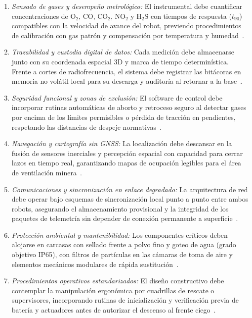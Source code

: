 \begin{enumerate}
    \item \textit{Sensado de gases y desempeño metrológico:} El instrumental debe cuantificar concentraciones de $\text{O}_2$, $\text{CO}$, $\text{CO}_2$, $\text{NO}_2$ y $\text{H}_2\text{S}$ con tiempos de respuesta ($t_{90}$) compatibles con la velocidad de avance del robot, previendo procedimientos de calibración con gas patrón y compensación por temperatura y humedad~\cite{OSINERGMIN_BoletinGSM_Ventilacion_2020, MINEM_DS024_2016}.
    
    \item \textit{Trazabilidad y custodia digital de datos:} Cada medición debe almacenarse junto con su coordenada espacial 3D y marca de tiempo determinística. Frente a cortes de radiofrecuencia, el sistema debe registrar las bitácoras en memoria no volátil local para su descarga y auditoría al retornar a la base~\cite{MINEM_DS024_2016, OSINERGMIN_BoletinGSM_2020}.
    
    \item \textit{Seguridad funcional y zonas de exclusión:} El software de control debe incorporar rutinas automáticas de aborto y retroceso seguro al detectar gases por encima de los límites permisibles o pérdida de tracción en pendientes, respetando las distancias de despeje normativas~\cite{MINEM_DS024_2016, OSINERGMIN_BoletinGSM_Ventilacion_2020}.
    
    \item \textit{Navegación y cartografía sin GNSS:} La localización debe descansar en la fusión de sensores inerciales y percepción espacial con capacidad para cerrar lazos en tiempo real, garantizando mapas de ocupación legibles para el área de ventilación minera~\cite{KimChoi_2025_MineMapping}.
    
    \item \textit{Comunicaciones y sincronización en enlace degradado:} La arquitectura de red debe operar bajo esquemas de sincronización local punto a punto entre ambos robots, asegurando el almacenamiento provisional y la integridad de los paquetes de telemetría sin depender de conexión permanente a superficie~\cite{OSINERGMIN_BoletinGSM_2020}.
    
    \item \textit{Protección ambiental y mantenibilidad:} Los componentes críticos deben alojarse en carcasas con sellado frente a polvo fino y goteo de agua (grado objetivo IP65), con filtros de partículas en las cámaras de toma de aire y elementos mecánicos modulares de rápida sustitución~\cite{AdvancesMining_2023}.
    
    \item \textit{Procedimientos operativos estandarizados:} El diseño constructivo debe contemplar la manipulación ergonómica por cuadrillas de rescate o supervisores, incorporando rutinas de inicialización y verificación previa de batería y actuadores antes de autorizar el descenso al frente ciego~\cite{MINEM_DS024_2016, OSINERGMIN_BoletinGSM_Ventilacion_2020}.
\end{enumerate}

